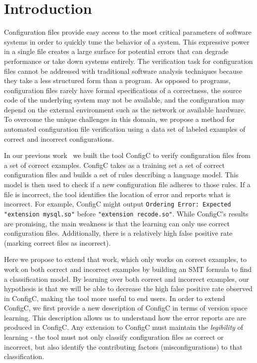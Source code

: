 \section{Introduction}

Configuration files provide easy access to the most critical parameters of software systems in order to quickly tune the behavior of a system.
This expressive power in a single file creates a large surface for potential errors that can degrade performance or take down systems entirely.
The verification task for configuration files cannot be addressed with traditional software analysis techniques because they take a less structured form than a program.
As opposed to programs, configuration files rarely have formal specifications of a correctness, 
  the source code of the underlying system may not be available, 
  and the configuration may depend on the external environment such as the network or available hardware.
To overcome the unique challenges in this domain, we propose a method for automated configuration file verification using a data set of labeled examples of correct and incorrect configurations.

In our previous work~\cite{Santolucito2016} we built the tool ConfigC to verify configuration files from a set of correct examples.
ConfigC takes as a training set a set of correct configuration files and builds a set of rules describing a language model.
This model is then used to check if a new configuration file adheres to those rules.
If a file is incorrect, the tool identifies the location of error and reports what is incorrect.
For example, ConfigC might output \texttt{Ordering Error: Expected "extension mysql.so"} before \texttt{"extension recode.so"}.
While ConfigC's results are promising, the main weakness is that the learning can only use correct configuration files.
Additionally, there is a relatively high false positive rate (marking correct files as incorrect).

Here we propose to extend that work, which only works on correct examples, to work on both correct and incorrect examples by building an SMT formula to find a classification model.
By learning over both correct and incorrect examples, our hypothesis is that we will be able to decrease the high false positive rate observed in ConfigC, making the tool more useful to end users.
In order to extend ConfigC, we first provide a new description of ConfigC in terms of version space learning.
This description allows us to understand how the error reports are are produced in ConfigC.
Any extension to ConfigC must maintain the \textit{legibility} of learning - the tool must not only classify configuration files as correct or incorrect, but also identify the contributing factors (misconfigurations) to that classification.

